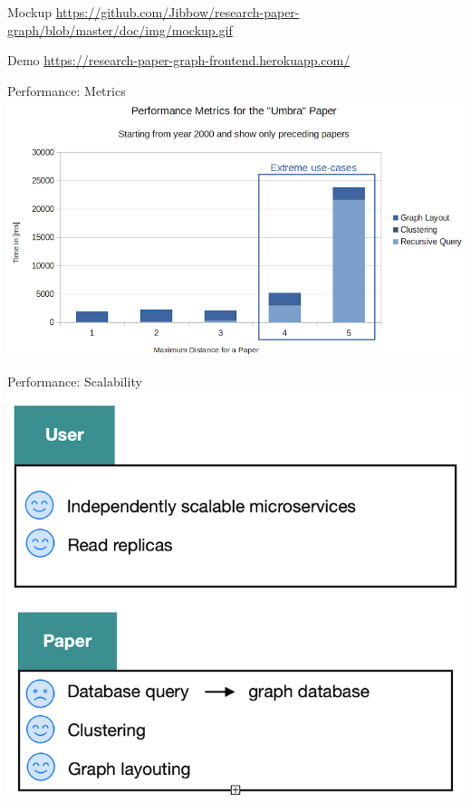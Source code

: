 \documentclass{beamer}
\begin{document}
\begin{frame}{Mockup}
    \url{https://github.com/Jibbow/research-paper-graph/blob/master/doc/img/mockup.gif}
\end{frame}

\begin{frame}{Demo}
    \url{https://research-paper-graph-frontend.herokuapp.com/}
\end{frame}

\begin{frame}{Performance: Metrics}
    \includegraphics{img_25.png}
\end{frame}

\begin{frame}{Performance: Scalability}
    \includegraphics{img_26.png}
\end{frame}
\end{document}
